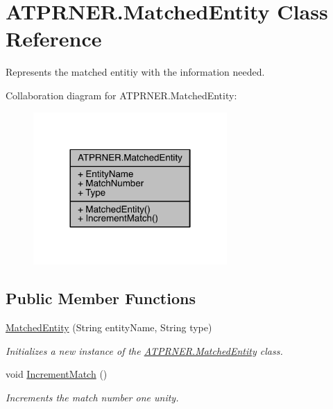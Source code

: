 \hypertarget{class_a_t_p_r_n_e_r_1_1_matched_entity}{}\section{A\+T\+P\+R\+N\+E\+R.\+Matched\+Entity Class Reference}
\label{class_a_t_p_r_n_e_r_1_1_matched_entity}


Represents the matched entitiy with the information needed.  




Collaboration diagram for A\+T\+P\+R\+N\+E\+R.\+Matched\+Entity\+:\nopagebreak
\begin{figure}[H]
\begin{center}
\leavevmode
\includegraphics[width=209pt]{d6/dd7/class_a_t_p_r_n_e_r_1_1_matched_entity__coll__graph}
\end{center}
\end{figure}
\subsection*{Public Member Functions}
\begin{DoxyCompactItemize}
\item 
\hyperlink{class_a_t_p_r_n_e_r_1_1_matched_entity_a5737ccd3008395ca92559e0b1b1f3e73}{Matched\+Entity} (String entity\+Name, String type)
\begin{DoxyCompactList}\small\item\em Initializes a new instance of the \hyperlink{class_a_t_p_r_n_e_r_1_1_matched_entity}{A\+T\+P\+R\+N\+E\+R.\+Matched\+Entity} class. \end{DoxyCompactList}\item 
void \hyperlink{class_a_t_p_r_n_e_r_1_1_matched_entity_ae6fa09ea42c0787d4279ceb5076c5f14}{Increment\+Match} ()
\begin{DoxyCompactList}\small\item\em Increments the match number one unity. \end{DoxyCompactList}\end{DoxyCompactItemize}
